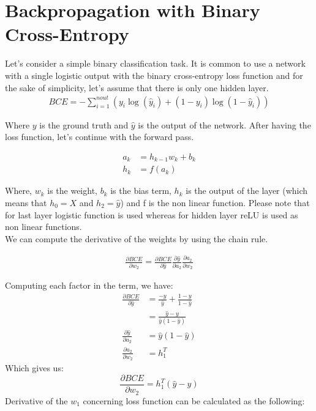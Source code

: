 \documentclass[
]{article}
\author{}
\date{\vspace{-2.5em}}
\begin{document}
\startappendices

\hypertarget{chap:appendix_a}{%
\section{Backpropagation with Binary
Cross-Entropy}\label{chap:appendix_a}}

Let's consider a simple binary classification task. It is common to use
a network with a single logistic output with the binary cross-entropy
loss function and for the sake of simplicity, let's assume that there is
only one hidden layer. \[
\begin{aligned}
BCE=-\sum_{i=1}^{n o u t}\left(y_i \log \left(\hat{y}_i \right)+\left(1-y_i\right) \log \left(1-\hat{y}_i\right)\right)
\end{aligned}
\]

Where \(y\) is the ground truth and \(\hat{y}\) is the output of the
network. After having the loss function, let's continue with the forward
pass.

\[
\begin{aligned} 
a_{k} &= h_{k-1} w_{k} + b_k \\
h_k &= f(a_{k})
\end{aligned}
\]

Where, \(w_k\) is the weight, \(b_{k}\) is the bias term, \(h_k\) is the
output of the layer (which means that \(h_0 = X\) and \(h_2 = \hat{y}\))
and f is the non linear function. Please note that for last layer
logistic function is used whereas for hidden layer reLU is used as non
linear functions.\\
We can compute the derivative of the weights by using the chain rule.

\[
\begin{aligned} 
\frac{\partial BCE}{\partial w_{2}}=\frac{\partial BCE}{\partial \hat{y}} \frac{\partial \hat{y}}{\partial a_{2}} \frac{\partial a_{2}}{\partial w_{2}}
\end{aligned}
\]

Computing each factor in the term, we have: \[
\begin{aligned}
\frac{\partial BCE}{\partial \hat{y}} &=\frac{-y}{\hat{y}}+\frac{1-y}{1-\hat{y}} \\
&=\frac{\hat{y}-y}{\hat{y}\left(1-\hat{y}\right)} \\
\frac{\partial \hat{y}}{\partial a_{2}} &=\hat{y}\left(1-\hat{y}\right) \\
\frac{\partial a_{2}}{\partial w_{2}} &=h_{1}^T
\end{aligned}
\] Which gives us: \[
\frac{\partial BCE}{\partial w_{2}}=h_{1}^T\left(\hat{y}-y\right)
\] Derivative of the \(w_1\) concerning loss function can be calculated
as the following:
\end{document}
